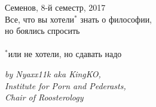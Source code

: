 

\begin{titlepage}
\par 
\vspace*{-2cm}
\begin{center}
{\sf \Large
\vspace*{1.5cm}
{\Huge Семенов, 8-й семестр, 2017}\\
{ Все, что вы хотели$^*$ знать о философии,\\ но боялись спросить}}\\
\vspace*{2cm}
 \\
$^*${\small или не хотели, но сдавать надо}
\begin{flushright}
\sl\small
by Nyaxx11k aka KingKO,\\
Institute for Porn and Pederasts,\\
Chair of Roosterology
\end{flushright}
\end{center}
\end{titlepage}
\topmargin -1cm 
\hoffset -0.7in 
\textwidth 6.0in 
\textheight 9.0in 
\normalsize 
{}
\tableofcontents
\pagebreak

